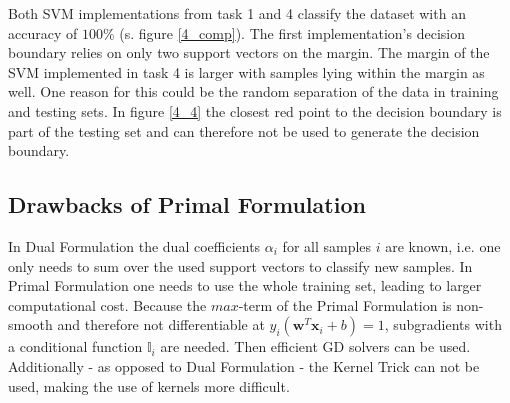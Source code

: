 \documentclass{article}
\begin{document}
Both SVM implementations from task 1 and 4 classify the dataset with an accuracy of $100\%$ (s. figure \ref{4_comp}). The first implementation's decision boundary relies on only two support vectors on the margin. The margin of the SVM implemented in task 4 is larger with samples lying within the margin as well. One reason for this could be the random separation of the data in training and testing sets. In figure \ref{4_4} the closest red point to the decision boundary is part of the testing set and can therefore not be used to generate the decision boundary.

\subsection{Drawbacks of Primal Formulation}

In Dual Formulation the dual coefficients $\alpha_i$ for all samples $i$ are known, i.e. one only needs to sum over the used support vectors to classify new samples. In Primal Formulation one needs to use the whole training set, leading to larger computational cost. Because the $max$-term of the Primal Formulation is non-smooth and therefore not differentiable at $y_i(\mathbf{w}^T\mathbf{x}_i+b) = 1$, subgradients with a conditional function $\mathbb{I}_i$ are needed. Then efficient GD solvers can be used.\\
Additionally - as opposed to Dual Formulation - the Kernel Trick can not be used, making the use of kernels more difficult.
\end{document}

